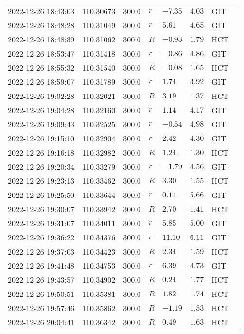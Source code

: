 \documentclass{nature_plusfigure}
\begin{document}
\begin{supplement}
\begin{center}
\begin{longtable}{llllllll}
2022-12-26 18:43:03 & 110.30673 & 300.0 & $r$ & $-7.35$ & $4.03$ & GIT &  \\ 
2022-12-26 18:48:28 & 110.31049 & 300.0 & $r$ & $5.61$ & $4.65$ & GIT &  \\ 
2022-12-26 18:48:39 & 110.31062 & 300.0 & $R$ & $-0.93$ & $1.79$ & HCT &  \\ 
2022-12-26 18:53:47 & 110.31418 & 300.0 & $r$ & $-0.86$ & $4.86$ & GIT &  \\ 
2022-12-26 18:55:32 & 110.31540 & 300.0 & $R$ & $-0.08$ & $1.65$ & HCT &  \\ 
2022-12-26 18:59:07 & 110.31789 & 300.0 & $r$ & $1.74$ & $3.92$ & GIT &  \\ 
2022-12-26 19:02:28 & 110.32021 & 300.0 & $R$ & $3.19$ & $1.37$ & HCT &  \\ 
2022-12-26 19:04:28 & 110.32160 & 300.0 & $r$ & $1.14$ & $4.17$ & GIT &  \\ 
2022-12-26 19:09:43 & 110.32525 & 300.0 & $r$ & $-0.54$ & $4.98$ & GIT &  \\ 
2022-12-26 19:15:10 & 110.32904 & 300.0 & $r$ & $2.42$ & $4.30$ & GIT &  \\ 
2022-12-26 19:16:18 & 110.32982 & 300.0 & $R$ & $1.24$ & $1.30$ & HCT &  \\ 
2022-12-26 19:20:34 & 110.33279 & 300.0 & $r$ & $-1.79$ & $4.56$ & GIT &  \\ 
2022-12-26 19:23:13 & 110.33462 & 300.0 & $R$ & $3.30$ & $1.55$ & HCT &  \\ 
2022-12-26 19:25:50 & 110.33644 & 300.0 & $r$ & $0.11$ & $5.66$ & GIT &  \\ 
2022-12-26 19:30:07 & 110.33942 & 300.0 & $R$ & $2.70$ & $1.41$ & HCT &  \\ 
2022-12-26 19:31:07 & 110.34011 & 300.0 & $r$ & $5.85$ & $5.00$ & GIT &  \\ 
2022-12-26 19:36:22 & 110.34376 & 300.0 & $r$ & $11.10$ & $6.11$ & GIT &  \\ 
2022-12-26 19:37:03 & 110.34423 & 300.0 & $R$ & $2.34$ & $1.59$ & HCT &  \\ 
2022-12-26 19:41:48 & 110.34753 & 300.0 & $r$ & $6.39$ & $4.73$ & GIT &  \\ 
2022-12-26 19:43:57 & 110.34902 & 300.0 & $R$ & $0.24$ & $1.77$ & HCT &  \\ 
2022-12-26 19:50:51 & 110.35381 & 300.0 & $R$ & $1.82$ & $1.74$ & HCT &  \\ 
2022-12-26 19:57:46 & 110.35862 & 300.0 & $R$ & $-1.19$ & $1.53$ & HCT &  \\ 
2022-12-26 20:04:41 & 110.36342 & 300.0 & $R$ & $0.49$ & $1.63$ & HCT &  \\ 

\end{longtable}
\end{center}
\end{supplement}
\end{document}
